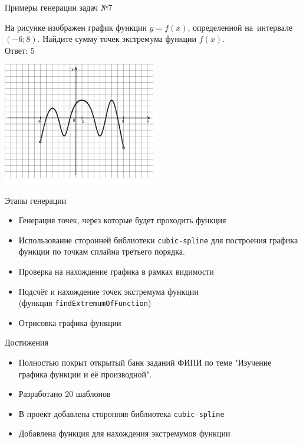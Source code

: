 \documentclass[aspectratio=169,12pt]{beamer}
\begin{document}
\begin{frame}{Примеры генерации задач №7}
    \begin{multicols}{2}
        На рисунке изображен график функции $y=f (x)$, определенной на~интервале $ (-6;8)$. Найдите сумму точек экстремума функции $f (x)$.\\

        Ответ: $5$

        \includegraphics[width=0.5\textwidth]{images/020693809529216n0}
    \end{multicols}
\end{frame}

\begin{frame}{Этапы генерации}
    \begin{itemize}
        \item Генерация точек, через которые будет проходить функция
        \item Использование сторонней библиотеки \texttt{cubic-spline} для построения графика функции по точкам сплайна третьего порядка.
        \item Проверка на нахождение графика в рамках видимости %
        \item Подсчёт и нахождение точек экстремума функции \\(функция \texttt{findExtremumOfFunction})
        \item Отрисовка графика функции
    \end{itemize}
    
\end{frame}


\begin{frame}{Достижения}
    \begin{itemize}
        \item Полностью покрыт открытый банк заданий ФИПИ по теме "Изучение графика функции и её производной".
        \item Разработано 20 шаблонов
        \item В проект добавлена сторонняя библиотека \texttt{cubic-spline}
        \item Добавлена функция для нахождения экстремумов функции
    \end{itemize}
    
\end{frame}
\end{document}
